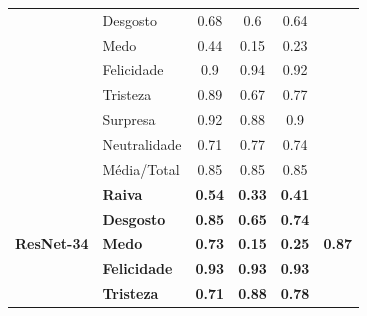\begin{table}[]
\begin{tabular}{llcccc}
                                       & Desgosto              & 0.68                         & 0.6                           & 0.64                         &                                \\
                                       & Medo                  & 0.44                         & 0.15                          & 0.23                         &                                \\
                                       & Felicidade            & 0.9                          & 0.94                          & 0.92                         &                                \\
                                       & Tristeza              & 0.89                         & 0.67                          & 0.77                         &                                \\
                                       & Surpresa              & 0.92                         & 0.88                          & 0.9                          &                                \\
                                       & Neutralidade          & 0.71                         & 0.77                          & 0.74                         &                                \\
                                       & Média/Total           & 0.85                         & 0.85                          & 0.85                         &                                \\ \hline
\multirow{8}{*}{\textbf{ResNet-34}} & \textbf{Raiva}        & \textbf{0.54}                & \textbf{0.33}                 & \textbf{0.41}                & \multirow{8}{*}{\textbf{0.87}} \\
                                       & \textbf{Desgosto}     & \textbf{0.85}                & \textbf{0.65}                 & \textbf{0.74}                &                                \\
                                       & \textbf{Medo}         & \textbf{0.73}                & \textbf{0.15}                 & \textbf{0.25}                &                                \\
                                       & \textbf{Felicidade}   & \textbf{0.93}                & \textbf{0.93}                 & \textbf{0.93}                &                                \\
                                       & \textbf{Tristeza}     & \textbf{0.71}                & \textbf{0.88}                 & \textbf{0.78}                &                                \\

\end{tabular}
\end{table}
